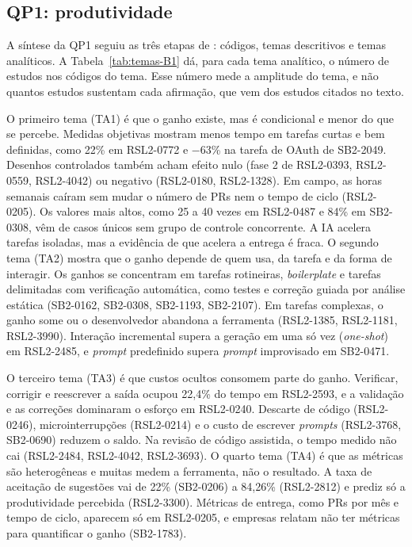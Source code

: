 \subsection{QP1: produtividade}
\label{sec:resultados-rsl2-qp1}



A síntese da QP1 seguiu as três etapas de :
códigos, temas descritivos e temas analíticos. A Tabela~\ref{tab:temas-B1}
dá, para cada tema analítico, o número de estudos nos códigos do tema. Esse
número mede a amplitude do tema, e não quantos estudos sustentam cada
afirmação, que vem dos estudos citados no texto.

O primeiro tema (TA1) é que o ganho existe, mas é condicional e menor do que
se percebe. Medidas objetivas mostram menos tempo em tarefas curtas e bem
definidas, como 22\% em RSL2-0772 e $-$63\% na tarefa de OAuth de SB2-2049.
Desenhos controlados também acham efeito nulo (fase 2 de RSL2-0393, RSL2-0559,
RSL2-4042) ou negativo (RSL2-0180, RSL2-1328). Em campo, as horas semanais
caíram sem mudar o número de PRs nem o tempo de ciclo (RSL2-0205). Os valores
mais altos, como 25 a 40 vezes em RSL2-0487 e 84\% em SB2-0308, vêm de casos
únicos sem grupo de controle concorrente. A IA acelera tarefas isoladas, mas
a evidência de que acelera a entrega é fraca. O segundo tema (TA2) mostra que
o ganho depende de quem usa, da tarefa e da forma de interagir. Os ganhos se
concentram em tarefas rotineiras, \textit{boilerplate} e tarefas delimitadas
com verificação automática, como testes e correção guiada por análise
estática (SB2-0162, SB2-0308, SB2-1193, SB2-2107). Em tarefas complexas, o
ganho some ou o desenvolvedor abandona a ferramenta (RSL2-1385, RSL2-1181,
RSL2-3990). Interação incremental supera a geração em uma só vez
(\textit{one-shot}) em RSL2-2485, e \textit{prompt} predefinido supera
\textit{prompt} improvisado em SB2-0471.

O terceiro tema (TA3) é que custos ocultos consomem parte do ganho. Verificar,
corrigir e reescrever a saída ocupou 22,4\% do tempo em RSL2-2593, e a
validação e as correções dominaram o esforço em RSL2-0240. Descarte de código
(RSL2-0246), microinterrupções (RSL2-0214) e o custo de escrever
\textit{prompts} (RSL2-3768, SB2-0690) reduzem o saldo. Na revisão de código
assistida, o tempo medido não cai (RSL2-2484, RSL2-4042, RSL2-3693). O quarto tema (TA4) é
que as métricas são heterogêneas e muitas medem a ferramenta, não o
resultado. A taxa de aceitação de sugestões vai de 22\% (SB2-0206) a 84,26\%
(RSL2-2812) e prediz só a produtividade percebida (RSL2-3300). Métricas de
entrega, como PRs por mês e tempo de ciclo, aparecem só em RSL2-0205, e
empresas relatam não ter métricas para quantificar o ganho (SB2-1783).

